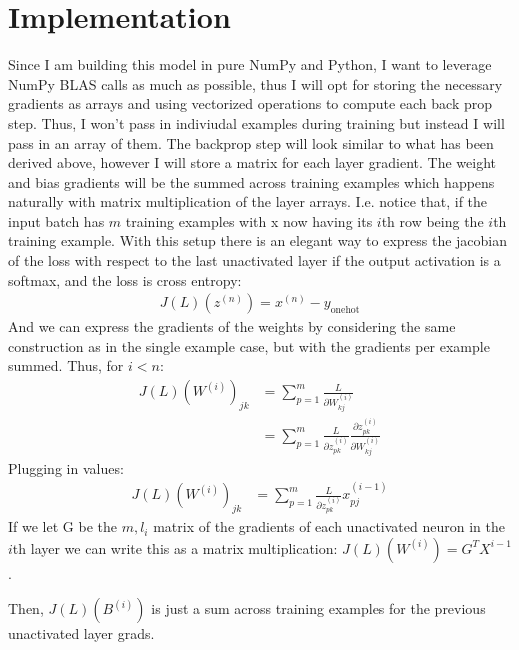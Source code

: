 \documentclass[12pt]{article}
\begin{document}
\section*{Implementation}
Since I am building this model in pure NumPy and Python, I want to leverage
NumPy BLAS calls as much as possible, thus I will opt for storing the necessary gradients
as arrays and using vectorized operations to compute each back prop step. Thus, I won't pass in indiviudal
examples during training but instead I will pass in an array of them. The backprop step will look similar to what has
been derived above, however I will store a matrix for each layer gradient. The weight and bias gradients
will be the summed across training examples which happens naturally with matrix multiplication of the layer arrays.
I.e. notice that, if the input batch has $m$ training examples with x now having its $i$th row
being the $i$th training example. With this setup there is an elegant way
to express the jacobian of the loss with respect to the last unactivated layer if the output
activation is a softmax, and the loss is cross entropy:
\begin{align*}
    J(L)(z^{(n)}) = x^{(n)} - y_{\text{onehot}}
\end{align*}
And we can express the gradients of the weights by considering the same
construction as in the single example case, but with the gradients per example
summed. Thus, for $i < n$:
\begin{align*}
    J(L)(W^{(i)})_{jk} &= \sum_{p=1}^{m}\frac{L}{\partial W^{(i)}_{kj}} \\
    &= \sum_{p=1}^{m}\frac{L}{\partial z^{(i)}_{pk}}\frac{\partial z^{(i)}_{pk}}{\partial W^{(i)}_{kj}}
\end{align*}
Plugging in values:
\begin{align*}
    J(L)(W^{(i)})_{jk} &= \sum_{p=1}^{m}\frac{L}{\partial z^{(i)}_{pk}}x_{pj}^{(i-1)}
\end{align*}
If we let G be the $m, l_i$ matrix of the gradients of each unactivated neuron in the $i$th layer
we can write this as a matrix multiplication: $J(L)(W^{(i)}) = G^TX^{i-1}$.


Then, $J(L)(B^{(i)})$ is just a sum across training examples for the previous unactivated layer grads. 
\end{document}
